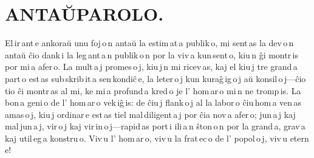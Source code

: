 \documentclass[ngerman,12pt,twoside]{book}
\begin{document}
\setlength{\parskip}{0pt}

\vspace*{\fill}

%
%
\titleformat{\chapter}[display]{\centering}{}{0pt}{\cowboyfont\LARGE}
\renewcommand{\footrulewidth}{0pt}
\chapter*{ANTAŬPAROLO.}
\fancyhead[C]{--- \thepage{} ---}

\begin{center}
\end{center}

El\,ir\,ant\,e ankoraŭ unu foj\,o\,n antaŭ la estim\,at\,a publik\,o, mi sent\,as la dev\,o\,n antaŭ ĉio dank\,i la leg\,ant\,a\,n publik\,o\,n por la viv\,a kun\,sent\,o, kiu\,n ĝi montr\,is por mi\,a afer\,o. La mult\,a\,j promes\,o\,j, kiu\,j\,n mi ricev\,as, kaj el kiu\,j tre grand\,a part\,o est\,as sub\,skrib\,it\,a \glqq{}sen\,kondiĉ\,e\grqq{}, la leter\,o\,j kun kuraĝ\,ig\,o\,j aŭ konsil\,o\,j---ĉio tio ĉi montr\,as al mi, ke mi\,a profund\,a kred\,o je l' hom\,ar\,o mi\,n ne tromp\,is. La bon\,a geni\,o de l' hom\,ar\,o vek\,iĝ\,is: de ĉiu\,j flank\,o\,j al la labor\,o ĉiu\,hom\,a ven\,as amas\,o\,j, kiu\,j ordinar\,e est\,as tiel mal\,diligent\,a\,j por ĉia nov\,a afer\,o; jun\,a\,j kaj mal\,jun\,a\,j, vir\,o\,j kaj vir\,in\,o\,j---rapid\,as port\,i ili\,a\,n ŝton\,o\,n por la grand\,a, grav\,a kaj util\,eg\,a konstru\,o. Viv\,u l' hom\,ar\,o, viv\,u la frat\,ec\,o de l' popol\,o\,j, viv\,u etern\,e!
\end{document}
